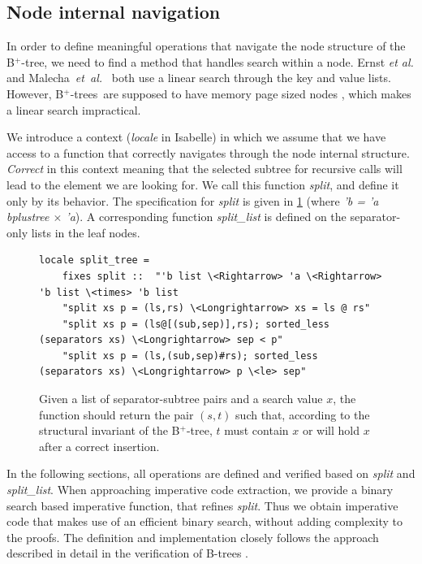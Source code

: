 \documentclass[runningheads]{llncs}
\newcommand{\btree}{B$^+$-tree}
\newcommand{\btrees}{B$^+$-trees}
\begin{document}
\subsection{Node internal navigation}
\label{sec:split}

In order to define meaningful operations that navigate
the node structure of the \btree,
we need to find a method that handles search within a node.
Ernst \emph{et al.} \cite{DBLP:journals/sosym/ErnstSR15} and Malecha~\emph{et~al.}~\cite{DBLP:conf/popl/MalechaMSW10}
both use a linear search through the key and value lists.
However, \btrees\ are supposed to have memory page sized nodes \cite{DBLP:journals/csur/Comer79}, 
which makes a linear search impractical.

We introduce a context (\emph{locale} in Isabelle) in which we assume that we
have access to a function that correctly navigates through the node internal structure.
\emph{Correct} in this context meaning that the selected subtree for recursive calls
will lead to the element we are looking for.
We call this function \emph{split}, and define it only by its behavior.
The specification for \emph{split} is given in \cref{fig:split-def} (where \emph{'b = 'a bplustree $\times$ 'a}).
A corresponding function \emph{split\_list} is defined on the separator-only lists in the leaf nodes.

\begin{figure}
   \centering 
\begin{lstlisting}[mathescape=true, language=Isabelle,label=lst:split-def]
locale split_tree =
    fixes split ::  "'b list \<Rightarrow> 'a \<Rightarrow> 'b list \<times> 'b list
    "split xs p = (ls,rs) \<Longrightarrow> xs = ls @ rs" 
    "split xs p = (ls@[(sub,sep)],rs); sorted_less (separators xs) \<Longrightarrow> sep < p" 
    "split xs p = (ls,(sub,sep)#rs); sorted_less (separators xs) \<Longrightarrow> p \<le> sep" 

\end{lstlisting}
    \caption[Definition of \emph{split}]{
        Given a list of separator-subtree pairs and a search value $x$, the function should return the pair $(s,t)$ such that,
        according to the structural invariant of the \btree, $t$ must contain $x$ or will hold $x$ after a correct insertion.
    }
    \label{fig:split-def}
\end{figure}

In the following sections, all operations are defined and verified
based on \emph{split} and \emph{split\_list}.
When approaching imperative code extraction,
we provide a binary search based imperative function, that refines \emph{split}.
Thus we obtain imperative code that makes use of an efficient
binary search, without adding complexity to the proofs.
The definition and implementation closely follows
the approach described in detail in the
verification of B-trees \cite{DBLP:journals/afp/Mundler21}.
\end{document}
